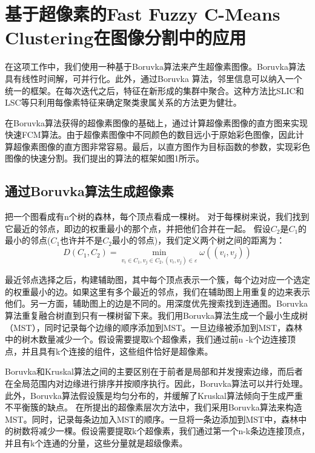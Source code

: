 
\chapter{基于超像素的Fast Fuzzy C-Means Clustering在图像分割中的应用}
在这项工作中，我们使用一种基于Boruvka算法来产生超像素图像。Boruvka算法具有线性时间解，可并行化。此外，通过Boruvka 算法，邻里信息可以纳入一个统一的框架。在每次迭代之后，特征在新形成的集群中聚合。这种方法比SLIC和LSC等只利用每像素特征来确定聚类隶属关系的方法更为健壮。

在Boruvka算法获得的超像素图像的基础上，通过计算超像素图像的直方图来实现快速FCM算法。由于超像素图像中不同颜色的数目远小于原始彩色图像，因此计算超像素图像的直方图非常容易。最后，以直方图作为目标函数的参数，实现彩色图像的快速分割。我们提出的算法的框架如图1所示。

\section{通过Boruvka算法生成超像素}

把一个图看成有n个树的森林，每个顶点看成一棵树。
对于每棵树来说，我们找到它最近的邻点，即边的权重最小的那个点，并把他们合并在一起。
假设$C_{2}$是$C_{1}$的最小的邻点($C_{1}$也许并不是$C_{2}$最小的邻点)，我们定义两个树之间的距离为：
\begin{equation}\label{eqn:hardassn}
D(C_{1},C_{2}) = \min_{v_{i}\in C_{1},v_{j}\in C_{2},(v_{i},v_{j})\in \varepsilon} \omega ((v_{i},v_{j}))
\end{equation}

最近邻点选择之后，构建辅助图，其中每个顶点表示一个簇，每个边对应一个选定的权重最小的边。如果这里有多个最近的邻点，我们在辅助图上用重复的边来表示他们。另一方面，辅助图上的边是不同的。用深度优先搜索找到连通图。Boruvka算法重复融合树直到只有一棵树留下来。我们用Boruvka算法生成一个最小生成树（MST），同时记录每个边缘的顺序添加到MST。一旦边缘被添加到MST，森林中的树木数量减少一个。假设需要提取k个超像素，我们通过前n -k个边连接顶点，并且具有k个连接的组件，这些组件恰好是超像素。

Boruvka和Kruskal算法之间的主要区别在于前者是局部和并发搜索边缘，而后者在全局范围内对边缘进行排序并按顺序执行。因此，Boruvka算法可以并行处理。此外，Boruvka算法假设簇是均匀分布的，并缓解了Kruskal算法倾向于生成严重不平衡簇的缺点。 在所提出的超像素层次方法中，我们采用Boruvka算法来构造MST。同时，记录每条边加入MST的顺序。一旦将一条边添加到MST中，森林中的树数将减少一棵。假设需要提取k个超像素，我们通过第一个n-k条边连接顶点，并且有k个连通的分量，这些分量就是超级像素。

